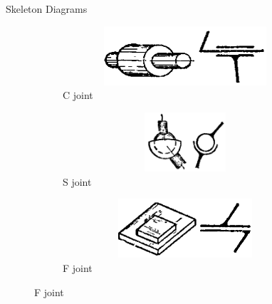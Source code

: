 \documentclass[aspectratio=169]{beamer}
\begin{document}
\begin{frame}[t]{Skeleton Diagrams}
\begin{figure}[H]
    \begin{subfigure}{0.32\textwidth}
        \centering\includegraphics[height=2.2cm,width=1\textwidth,keepaspectratio]{C_sd.png}
        \caption*{C joint}
    \end{subfigure}
    \begin{subfigure}{0.32\textwidth}
        \centering\includegraphics[height=2.2cm,width=1\textwidth,keepaspectratio]{S_sd.png}
        \caption*{S joint}
    \end{subfigure}
    \begin{subfigure}{0.32\textwidth}
        \centering\includegraphics[height=2.2cm,width=1\textwidth,keepaspectratio]{F_sd.png}
        \caption*{F joint}
    \end{subfigure}
\end{figure}
\end{frame}
\end{document}
